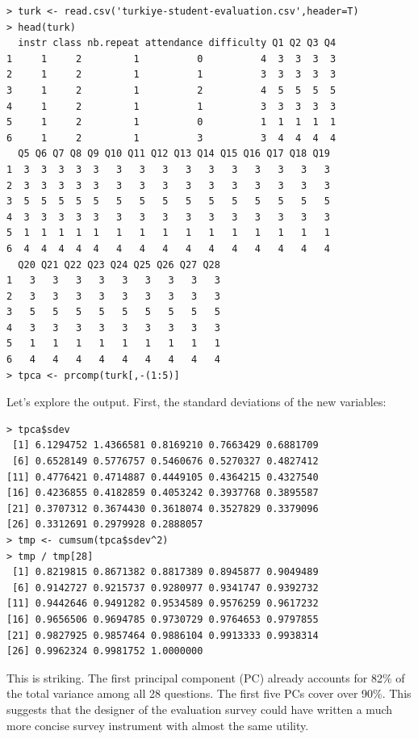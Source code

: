 \begin{lstlisting}
> turk <- read.csv('turkiye-student-evaluation.csv',header=T)
> head(turk)
  instr class nb.repeat attendance difficulty Q1 Q2 Q3 Q4
1     1     2         1          0          4  3  3  3  3
2     1     2         1          1          3  3  3  3  3
3     1     2         1          2          4  5  5  5  5
4     1     2         1          1          3  3  3  3  3
5     1     2         1          0          1  1  1  1  1
6     1     2         1          3          3  4  4  4  4
  Q5 Q6 Q7 Q8 Q9 Q10 Q11 Q12 Q13 Q14 Q15 Q16 Q17 Q18 Q19
1  3  3  3  3  3   3   3   3   3   3   3   3   3   3   3
2  3  3  3  3  3   3   3   3   3   3   3   3   3   3   3
3  5  5  5  5  5   5   5   5   5   5   5   5   5   5   5
4  3  3  3  3  3   3   3   3   3   3   3   3   3   3   3
5  1  1  1  1  1   1   1   1   1   1   1   1   1   1   1
6  4  4  4  4  4   4   4   4   4   4   4   4   4   4   4
  Q20 Q21 Q22 Q23 Q24 Q25 Q26 Q27 Q28
1   3   3   3   3   3   3   3   3   3
2   3   3   3   3   3   3   3   3   3
3   5   5   5   5   5   5   5   5   5
4   3   3   3   3   3   3   3   3   3
5   1   1   1   1   1   1   1   1   1
6   4   4   4   4   4   4   4   4   4
> tpca <- prcomp(turk[,-(1:5)]
\end{lstlisting}

Let's explore the output.  First, the standard deviations of the new
variables:

\begin{lstlisting}
> tpca$sdev
 [1] 6.1294752 1.4366581 0.8169210 0.7663429 0.6881709
 [6] 0.6528149 0.5776757 0.5460676 0.5270327 0.4827412
[11] 0.4776421 0.4714887 0.4449105 0.4364215 0.4327540
[16] 0.4236855 0.4182859 0.4053242 0.3937768 0.3895587
[21] 0.3707312 0.3674430 0.3618074 0.3527829 0.3379096
[26] 0.3312691 0.2979928 0.2888057
> tmp <- cumsum(tpca$sdev^2)
> tmp / tmp[28]
 [1] 0.8219815 0.8671382 0.8817389 0.8945877 0.9049489
 [6] 0.9142727 0.9215737 0.9280977 0.9341747 0.9392732
[11] 0.9442646 0.9491282 0.9534589 0.9576259 0.9617232
[16] 0.9656506 0.9694785 0.9730729 0.9764653 0.9797855
[21] 0.9827925 0.9857464 0.9886104 0.9913333 0.9938314
[26] 0.9962324 0.9981752 1.0000000
\end{lstlisting}

This is striking.  The first principal component (PC) already accounts
for 82\% of the total variance among all 28 questions.  The first five
PCs cover over 90\%.  This suggests that the designer of the evaluation
survey could have written a much more concise survey instrument with
almost the same utility.

